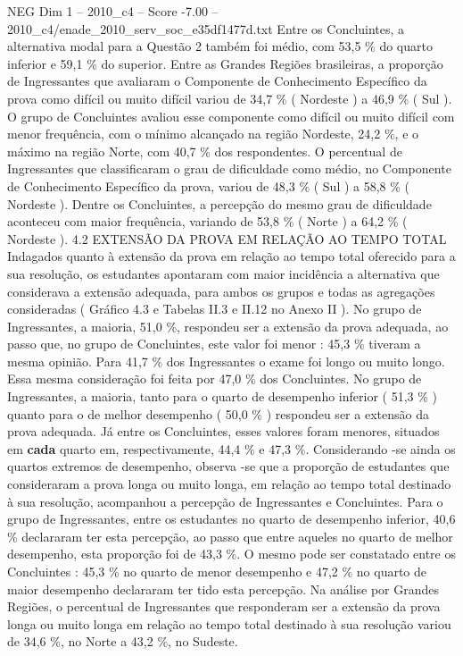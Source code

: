 \begin{textsample}{NEG Dim 1 – 2010\_c4 – Score -7.00 – 2010\_c4/enade\_2010\_serv\_soc\_e35df1477d.txt}
Entre os Concluintes, a alternativa modal para a Questão 2 também foi médio, com 53,5 \% do quarto inferior e 59,1 \% do superior.
Entre as Grandes Regiões brasileiras, a proporção de Ingressantes que avaliaram o Componente de Conhecimento Específico da prova como difícil ou muito difícil variou de 34,7 \% ( Nordeste ) a 46,9 \% ( Sul ).
O grupo de Concluintes avaliou esse componente como difícil ou muito difícil com menor frequência, com o mínimo alcançado na região Nordeste, 24,2 \%, e o máximo na região Norte, com 40,7 \% dos respondentes.
O percentual de Ingressantes que classificaram o grau de dificuldade como médio, no Componente de Conhecimento Específico da prova, variou de 48,3 \% ( Sul ) a 58,8 \% ( Nordeste ).
Dentre os Concluintes, a percepção do mesmo grau de dificuldade aconteceu com maior frequência, variando de 53,8 \% ( Norte ) a 64,2 \% ( Nordeste ). 4.2 EXTENSÃO DA PROVA EM RELAÇÃO AO TEMPO TOTAL Indagados quanto à extensão da prova em relação ao tempo total oferecido para a sua resolução, os estudantes apontaram com maior incidência a alternativa que considerava a extensão adequada, para ambos os grupos e todas as agregações consideradas ( Gráfico 4.3 e Tabelas II.3 e II.12 no Anexo II ).
No grupo de Ingressantes, a maioria, 51,0 \%, respondeu ser a extensão da prova adequada, ao passo que, no grupo de Concluintes, este valor foi menor : 45,3 \% tiveram a mesma opinião.
Para 41,7 \% dos Ingressantes o exame foi longo ou muito longo.
Essa mesma consideração foi feita por 47,0 \% dos Concluintes.
No grupo de Ingressantes, a maioria, tanto para o quarto de desempenho inferior ( 51,3 \% ) quanto para o de melhor desempenho ( 50,0 \% ) respondeu ser a extensão da prova adequada.
Já entre os Concluintes, esses valores foram menores, situados em \textbf{cada} quarto em, respectivamente, 44,4 \% e 47,3 \%.
Considerando -se ainda os quartos extremos de desempenho, observa -se que a proporção de estudantes que consideraram a prova longa ou muito longa, em relação ao tempo total destinado à sua resolução, acompanhou a percepção de Ingressantes e Concluintes.
Para o grupo de Ingressantes, entre os estudantes no quarto de desempenho inferior, 40,6 \% declararam ter esta percepção, ao passo que entre aqueles no quarto de melhor desempenho, esta proporção foi de 43,3 \%.
O mesmo pode ser constatado entre os Concluintes : 45,3 \% no quarto de menor desempenho e 47,2 \% no quarto de maior desempenho declararam ter tido esta percepção.
Na análise por Grandes Regiões, o percentual de Ingressantes que responderam ser a extensão da prova longa ou muito longa em relação ao tempo total destinado à sua resolução variou de 34,6 \%, no Norte a 43,2 \%, no Sudeste.

\end{textsample}
